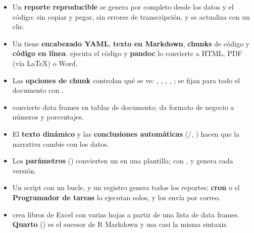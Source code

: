 \begin{resumen}
\begin{itemize}
  \item Un \textbf{reporte reproducible} se genera por completo desde los
        datos y el código: sin copiar y pegar, sin errores de transcripción,
        y se actualiza con un clic.
  \item Un  tiene \textbf{encabezado YAML}, \textbf{texto en
        Markdown}, \textbf{chunks} de código y \textbf{código en línea}.
         ejecuta el código y \textbf{pandoc} lo convierte a
        HTML, PDF (vía LaTeX) o Word.
  \item Las \textbf{opciones de chunk} controlan qué se ve:
        , , ,
        , ; se fijan para todo el
        documento con .
  \item {} convierte data frames en tablas de documento;
         da formato de negocio a números y porcentajes.
  \item El \textbf{texto dinámico} y las \textbf{conclusiones automáticas}
        (/, ) hacen que la
        narrativa cambie con los datos.
  \item Los \textbf{parámetros} () convierten un
         en una plantilla;  con
        ,  y 
        genera cada versión.
  \item Un script con un bucle,  y un registro genera
        todos los reportes; \textbf{cron} o el \textbf{Programador de tareas}
        lo ejecutan solos, y  los envía por correo.
  \item {} crea libros de Excel con varias hojas a partir de
        una lista de data frames. \textbf{Quarto} () es el
        sucesor de R Markdown y usa casi la misma sintaxis.
\end{itemize}
\end{resumen}

